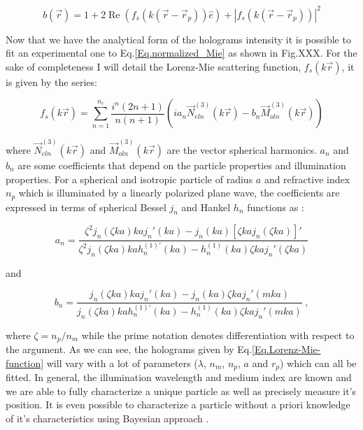 \begin{equation}
	b(\vec{r}) = 1 + 2 \operatorname{Re} 
	\left(  
		f_s(k(\vec{r}- \vec{r}_p)) \hat{e}
	\right)
	+
	|
		f_s(k(\vec{r}- \vec{r}_p))
	|^2
	\label{Eq.normalized_Mie}	
\end{equation}


Now that we have the analytical form of the holograms intensity it is possible to fit an experimental one to Eq.\ref{Eq.normalized_Mie} as shown in Fig.XXX. For the sake of completeness I will detail the Lorenz-Mie scattering function, $f_s(k\vec{r})$, it is given by the series:

\begin{equation}
	f_s(k \vec{r}) = \sum _{n=1} ^{n_c} 
	\frac
	{
		i^n (2n +1)
	}
	{
		n(n+1)
	}
	\left(
		i a_n \vec{N}^{(3)}_{eln}(k\vec{r})
		-
		b_n \vec{M}^{(3)}_{oln}(k\vec{r})
	\right)
	\label{Eq.Lorenz-Mie-function}
\end{equation} 


where $\vec{N}^{(3)}_{eln}(k\vec{r})$ and $\vec{M}^{(3)}_{oln}(k\vec{r})$ are the vector spherical harmonics. $a_n$ and $b_n$ are some coefficients that depend on the particle properties and illumination properties. For a spherical and isotropic particle of radius $a$ and refractive index $n_p$ which is illuminated by a linearly polarized plane wave, the coefficients are expressed in terms of spherical Bessel $j_n$ and Hankel $h_n$ functions as \cite{f_bohren_absorption_1998}:

\begin{equation}
	a_n = 
	\frac
	{
		\zeta^2 j_n (\zeta k a)k a j_n' (k a) - j_n(ka)[\zeta kaj_n(\zeta ka)]'
	}
	{
		\zeta^2 j_n (\zeta k a)k a h_n^{(1)'} (k a) - h_n^{(1)}(ka)\zeta kaj_n'(\zeta ka)
	}
\end{equation}

and

\begin{equation}
	b_n =
	\frac
	{
		j_n(\zeta k a) kaj_n'(ka) - j_n (ka) \zeta kaj_n'(mka)
	}
	{
		j_n(\zeta k a) kah_n^{(1)'}(ka) - h_n^{(1)} (ka) \zeta kaj_n '(mka)
	} ~,
\end{equation}


where $\zeta = n_p / n_m$ while the prime notation denotes differentiation with respect to the argument. As we can see, the holograms given by Eq.\ref{Eq.Lorenz-Mie-function} will vary with a lot of parameters ($\lambda$, $n_m$, $n_p$, $a$ and $r_p$) which can all be fitted. In general, the illumination wavelength and medium index are known and we are able to fully characterize a unique particle as well as precisely measure it's position. It is even possible to characterize a particle without a priori knowledge of it's characteristics using Bayesian approach \cite{gregory_bayesian_2005, dimiduk_bayesian_2016}.

